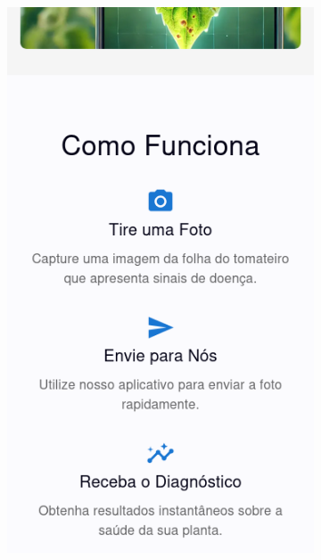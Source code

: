 \begin{figure}[p]
\begin{subfigure}{0.45\textwidth}
        \includegraphics[width=\linewidth, height=0.4\textheight, keepaspectratio]{images/homepage2.png}
    \end{subfigure}
    
    \vspace{0.5cm}
    

\end{figure}
